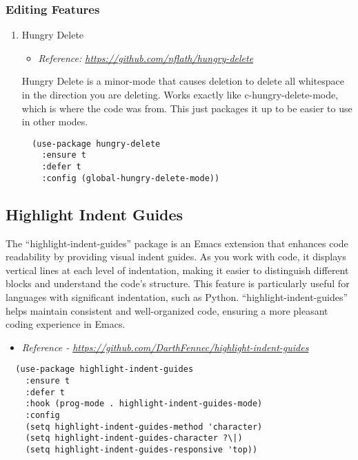 \documentclass[11pt]{article}
\begin{document}
\subsubsection{Editing Features}
\label{sec:orgbd69f24}
\begin{enumerate}
\item Hungry Delete
\label{sec:orge8b649c}
\begin{itemize}
\item \emph{Reference: \url{https://github.com/nflath/hungry-delete}}
\end{itemize}

Hungry Delete is a minor-mode that causes deletion to delete all whitespace in the direction you are deleting. Works exactly like c-hungry-delete-mode, which is where the code was from. This just packages it up to be easier to use in other modes.

\begin{verbatim}
  (use-package hungry-delete
    :ensure t
    :defer t
    :config (global-hungry-delete-mode))
\end{verbatim}
\end{enumerate}
\subsection{Highlight Indent Guides}
\label{sec:org0acb349}
The ``highlight-indent-guides'' package is an Emacs extension that enhances code readability by providing visual indent guides. As you work with code, it displays vertical lines at each level of indentation, making it easier to distinguish different blocks and understand the code's structure. This feature is particularly useful for languages with significant indentation, such as Python. ``highlight-indent-guides'' helps maintain consistent and well-organized code, ensuring a more pleasant coding experience in Emacs.

\begin{itemize}
\item \emph{Reference - \url{https://github.com/DarthFennec/highlight-indent-guides}}
\end{itemize}

\begin{verbatim}
  (use-package highlight-indent-guides
    :ensure t
    :defer t
    :hook (prog-mode . highlight-indent-guides-mode)
    :config
    (setq highlight-indent-guides-method 'character)
    (setq highlight-indent-guides-character ?\|)
    (setq highlight-indent-guides-responsive 'top))
\end{verbatim}
\end{document}
